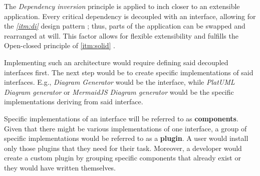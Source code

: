 The \textit{Dependency inversion} principle \cite{hall_adaptive_2017} is applied to inch closer to an extensible application. Every critical dependency is decoupled with an interface, allowing for the \textit{\ref{itm:di}} design pattern \cite{deursen_dependency_2019}; thus, parts of the application can be swapped and rearranged at will. This factor allows for flexible extensibility and fulfills the Open-closed principle of \ref{itm:solid} \cite{hall_adaptive_2017}.

Implementing such an architecture would require defining said decoupled interfaces first.
The next step would be to create specific implementations of said interfaces. E.g., \textit{Diagram Generator} would be the interface, while \textit{PlatUML Diagram generator} or \textit{MermaidJS Diagram generator} would be the specific implementations deriving from said interface.

Specific implementations of an interface will be referred to as \textbf{components}. Given that there might be various implementations of one interface, a group of specific implementations would be referred to as a \textbf{plugin}. A user would install only those plugins that they need for their task. Moreover, a developer would create a custom plugin by grouping specific components that already exist or they would have written themselves.

